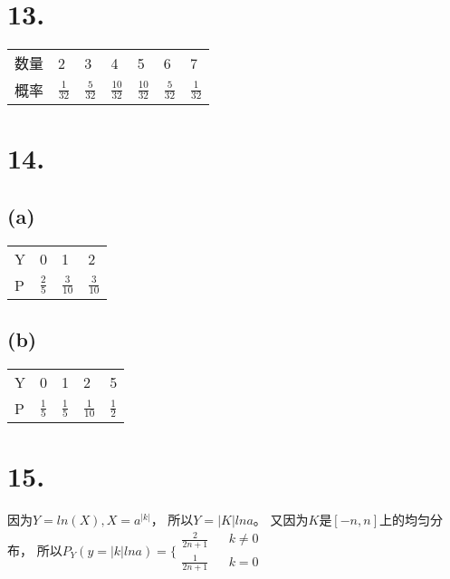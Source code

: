 \documentclass[UTF8]{report}
\begin{document}
    \section*{13.}
        \begin{table}[!htbp]
            \begin{tabular}{lllllll}
                数量 & 2 & 3 & 4 & 5 & 6 & 7\\
                概率 & $\frac{1}{32}$ & $\frac{5}{32}$ & $\frac{10}{32}$
                & $\frac{10}{32}$ & $\frac{5}{32}$ & $\frac{1}{32}$
            \end{tabular}
        \end{table}
    \section*{14.}
        \subsection*{(a)}
            \begin{table}[!htbp]
                \begin{tabular}{llll}
                    Y & 0 & 1 & 2 \\
                    P & $\frac{2}{5}$ & $\frac{3}{10}$ & $\frac{3}{10}$
                \end{tabular}
            \end{table}
        \subsection*{(b)}
            \begin{table}[!htbp]
                \begin{tabular}{lllll}
                    Y & 0 & 1 & 2 & 5\\
                    P & $\frac{1}{5}$ & $\frac{1}{5}$ & $\frac{1}{10}$ & $\frac{1}{2}$
                \end{tabular}
            \end{table}
    \section*{15.}
        因为$Y = ln(X), X = a^{|k|}$，
        所以$Y = |K|lna$。
        又因为$K$是$[-n, n]$上的均匀分布，
        所以$P_Y(y = |k|lna) = \{\begin{array}{lcr}
            \frac{2}{2n + 1} & & k \ne 0\\
            \frac{1}{2n + 1} & & k = 0
        \end{array}$
\end{document}
